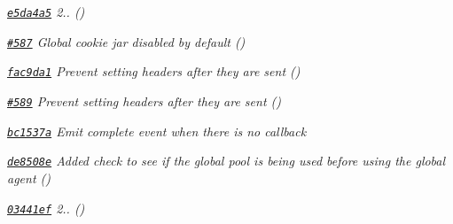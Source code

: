 \begin{DoxyItemize}
\item {\itshape \href{https://github.com/mikeal/request/commit/e5da4a5e1a20bf4f23681f7b996f22c5fadae91d}{\tt e5da4a5} 2.. ()}
\item {\itshape \href{https://github.com/mikeal/request/pull/587}{\tt \#587} Global cookie jar disabled by default ()}
\item {\itshape \href{https://github.com/mikeal/request/commit/fac9da1cc426bf0a4bcc5f0b7d0d0aea8b1cce38}{\tt fac9da1} Prevent setting headers after they are sent ()}
\item {\itshape \href{https://github.com/mikeal/request/pull/589}{\tt \#589} Prevent setting headers after they are sent ()}
\item {\itshape \href{https://github.com/mikeal/request/commit/bc1537ab79064cea532b0d14110ce4e49a663bde}{\tt bc1537a} Emit complete event when there is no callback}
\item {\itshape \href{https://github.com/mikeal/request/commit/de8508e9feac10563596aeee26727567b3c2e33c}{\tt de8508e} Added check to see if the global pool is being used before using the global agent ()}
\item {\itshape \href{https://github.com/mikeal/request/commit/03441ef919e51a742aaf9e168d917e97e2d9eb6b}{\tt 03441ef} 2.. () }
\end{DoxyItemize}